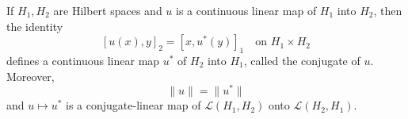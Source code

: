 If $H_1, H_2$ are Hilbert spaces and $u$ is a continuous linear map of $H_1$ into $H_2$, then the identity
$$[u(x), y]_2 = [x, u^*(y)]_1 \quad \text{on } H_1 \times H_2$$
defines a continuous linear map $u^*$ of $H_2$ into $H_1$, called the conjugate of $u$. Moreover,
$$\|u\| = \|u^*\|$$
and $u \mapsto u^*$ is a conjugate-linear map of $\mathcal{L}(H_1, H_2)$ onto $\mathcal{L}(H_2, H_1)$.
